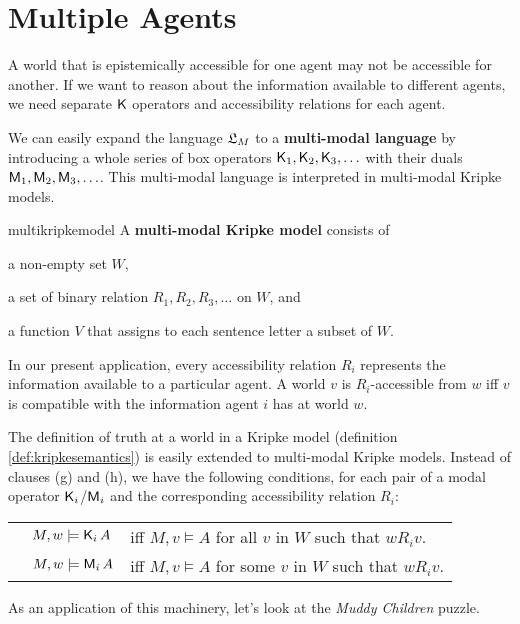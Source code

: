 \section{Multiple Agents}
\label{sec:multi}

A world that is epistemically accessible for one agent may not be accessible for
another. If we want to reason about the information available to different
agents, we need separate $\operatorname{\mathsf{K}{}}$ operators and accessibility relations for each
agent.

We can easily expand the language $\mathfrak{L}_M$ to a \textbf{multi-modal language} by
introducing a whole series of box operators $\operatorname{\mathsf{K}{}}_1, \operatorname{\mathsf{K}{}}_2, \operatorname{\mathsf{K}{}}_3, \ldots$ with
their duals $\operatorname{\mathsf{M}}_1, \operatorname{\mathsf{M}}_2, \operatorname{\mathsf{M}}_3, \ldots$. This multi-modal language is
interpreted in multi-modal Kripke models.

\begin{definition}{}{multikripkemodel}
  A \textbf{multi-modal Kripke model} consists of
  \vspace{-3mm}
  \begin{itemize*}
  \item a non-empty set $W$,
  \item a set of binary relation $R_1,R_2,R_{3},\ldots$ on $W$, and
  \item a function $V$ that assigns to each sentence letter a subset of $W$.
  \end{itemize*}
\end{definition}
%
In our present application, every accessibility relation $R_i$ represents the
information available to a particular agent. A world $v$ is $R_i$-accessible
from $w$ iff $v$ is compatible with the information agent $i$ has at world $w$.

The definition of truth at a world in a Kripke model (definition
\ref{def:kripkesemantics}) is easily extended to multi-modal Kripke models.
Instead of clauses (g) and (h), we have the following conditions, for each pair
of a modal operator $\operatorname{\mathsf{K}{}}_i$/$\operatorname{\mathsf{M}}_i$ and the corresponding accessibility
relation $R_i$:

\bigskip
\begin{tabular}{lll}
  & $M,w \models \operatorname{\mathsf{K}{}}_i A$ &iff $M,v \models A$ for all $v$ in $W$ such that $wR_iv$.\\
  & $M,w \models \operatorname{\mathsf{M}}_i A$ &iff $M,v \models A$ for some $v$ in $W$ such that $wR_iv$.
\end{tabular}
\bigskip

As an application of this machinery, let's look at the \emph{Muddy Children}
puzzle.

